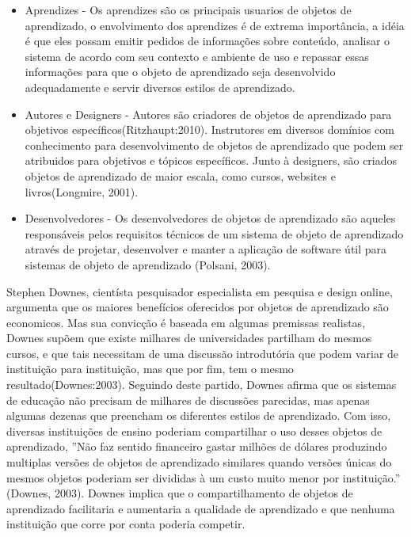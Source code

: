\documentclass[12pt,openright,oneside,a4paper,english,french,spanish,brazil]{unifil}
\begin{document}
\begin{itemize}
\item Aprendizes - Os aprendizes são os principais usuarios de objetos de aprendizado, o envolvimento dos aprendizes é de extrema importância, a idéia é que eles possam emitir pedidos de informações sobre conteúdo, analisar o sistema de acordo com seu contexto e ambiente de uso e repassar essas informações para que o objeto de aprendizado seja desenvolvido adequadamente e servir diversos estilos de aprendizado.
\item Autores e Designers - Autores são criadores de objetos de aprendizado para objetivos específicos(Ritzhaupt:2010). Instrutores em diversos domínios com conhecimento para desenvolvimento de objetos de aprendizado que podem ser atribuidos para objetivos e tópicos específicos. Junto à designers, são criados objetos de aprendizado de maior escala, como cursos, websites e livros(Longmire, 2001).
\item Desenvolvedores - Os desenvolvedores de objetos de aprendizado são aqueles responsáveis pelos requisitos técnicos de um sistema de objeto de aprendizado através de projetar, desenvolver e manter a aplicação de software útil para sistemas de objeto de aprendizado (Polsani, 2003). 
\end{itemize}

Stephen Downes, cientísta pesquisador especialista em pesquisa e design online, argumenta que os maiores benefícios oferecidos por objetos de aprendizado são economicos. Mas sua convicção é baseada em algumas premissas realistas, Downes supõem que existe milhares de universidades partilham do mesmos cursos, e que tais necessitam de uma discussão introdutória que podem variar de instituição para instituição, mas que por fim, tem o mesmo resultado(Downes:2003). Seguindo deste partido, Downes afirma que os sistemas de educação não precisam de milhares de discussões parecidas, mas apenas algumas dezenas que preencham os diferentes estilos de aprendizado. Com isso, diversas instituições de ensino poderiam compartilhar o uso desses objetos de aprendizado, ''Não faz sentido financeiro gastar milhões de dólares produzindo multiplas versões de objetos de aprendizado similares quando versões únicas do mesmos objetos poderiam ser divididas à um custo muito menor por instituição.'' (Downes, 2003). Downes implica que o compartilhamento de objetos de aprendizado facilitaria e aumentaria a qualidade de aprendizado e que nenhuma instituição que corre por conta poderia competir.
\end{document}
